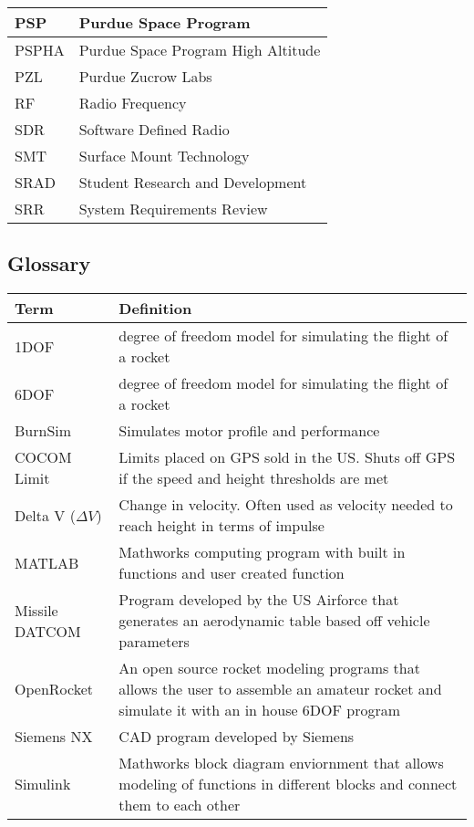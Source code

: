 \begin{table}[htbp]
\begin{tabular}{|p{5cm}|p{10cm}|}
        PSP & Purdue Space Program \\ \hline
        PSPHA & Purdue Space Program High Altitude \\ \hline
        PZL & Purdue Zucrow Labs \\ \hline
        RF & Radio Frequency \\ \hline
        SDR & Software Defined Radio \\ \hline
        SMT & Surface Mount Technology \\ \hline
        SRAD & Student Research and Development \\ \hline
        SRR & System Requirements Review \\ \hline
    \end{tabular}
\end{table}

\pagebreak

\subsection*{Glossary}

\begin{table}[htbp]\small
    \centering
    \begin{tabularx}{\textwidth}{|p{5cm}|>{\raggedright\arraybackslash}X|}
        \hline
        \textbf{Term} & \textbf{Definition} \\ \hline
        1DOF & 1 degree of freedom model for simulating the flight of a rocket \\ \hline
        6DOF & 6 degree of freedom model for simulating the flight of a rocket \\ \hline
        BurnSim & Simulates motor profile and performance \\ \hline
        COCOM Limit & Limits placed on GPS sold in the US. Shuts off GPS if the speed and height thresholds are met \\ \hline
        Delta V (\(\Delta V\)) & Change in velocity. Often used as velocity needed to reach height in terms of impulse \\ \hline
        MATLAB & Mathworks computing program with built in functions and user created function \\ \hline
        Missile DATCOM & Program developed by the US Airforce that generates an aerodynamic table based off vehicle parameters \\ \hline
        OpenRocket & An open source rocket modeling programs that allows the user to assemble an amateur rocket and simulate it with an in house 6DOF program \\ \hline
        Siemens NX & CAD program developed by Siemens \\ \hline
        Simulink & Mathworks block diagram enviornment that allows modeling of functions in different blocks and connect them to each other \\ \hline
    \end{tabularx}
\end{table}


\pagebreak
